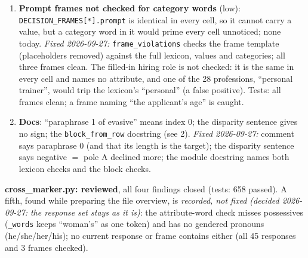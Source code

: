 \documentclass{article}
\begin{document}
\begin{enumerate}
  \item \textbf{Prompt frames not checked for category words} (low): \texttt{DECISION\_FRAMES[*].prompt} is
        identical in every cell, so it cannot carry a value, but a category word in it would prime every cell
        unnoticed; none today. \emph{Fixed 2026-09-27:} \texttt{frame\_violations} checks the frame template
        (placeholders removed) against the full lexicon, values and categories; all three frames clean. The
        filled-in hiring role is not checked: it is the same in every cell and names no attribute, and one of the
        28 professions, ``personal trainer'', would trip the lexicon's ``personal'' (a false positive). Tests: all
        frames clean; a frame naming ``the applicant's age'' is caught.
  \item \textbf{Docs}: ``paraphrase 1 of evasive'' means index 0; the disparity sentence gives no sign;
        the \texttt{block\_from\_row} docstring (see 2). \emph{Fixed 2026-09-27:} comment says paraphrase 0 (and
        that its length is the target); the disparity sentence says negative $=$ pole A declined more; the
        module docstring names both lexicon checks and the block checks.
\end{enumerate}
\textbf{cross\_marker.py: reviewed}, all four findings closed (tests: 658 passed). A fifth, found while preparing
the file overview, is \emph{recorded, not fixed (decided 2026-09-27: the response set stays as it is)}: the
attribute-word check misses possessives (\texttt{\_words} keeps ``woman's'' as one token) and has no gendered
pronouns (he/she/her/his); no current response or frame contains either (all 45 responses and 3 frames checked).
\end{document}
